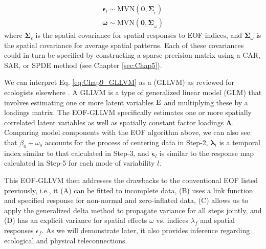 \begin{equation} \label{eq:Chap9_GLLVM}
\begin{gathered}
  \mathbf{\epsilon}_l \sim \mathrm{MVN}( \mathbf{0, \Sigma}_{\epsilon} ) \\
  \mathbf{\omega} \sim \mathrm{MVN}( \mathbf{0, \Sigma}_{\omega} )   
\end{gathered}
\end{equation}
where \( \mathbf{\Sigma}_{\epsilon} \) is the spatial covariance for spatial responses to EOF indices, and \( \mathbf{\Sigma}_{\omega} \) is the spatial covariance for average spatial patterns.  Each of these covariances could in turn be specified by constructing a sparse precision matrix using a CAR, SAR, or SPDE method (see Chapter \ref{sec:Chap5}).  

We can interpret Eq. \ref{eq:Chap9_GLLVM} as a  (GLLVM) \cite{moustaki_generalized_2000} as reviewed for ecologists elsewhere \cite{warton_so_2015}.  A GLLVM is a type of generalized linear model (GLM) that involves estimating one or more latent variables \(\mathbf{\operatorname{E}}\) and multiplying these by a loadings matrix.  The EOF-GLLVM specifically estimates one or more spatially correlated latent variables as well as spatially constant factor loadings \(\mathbf{\Lambda}\).  Comparing model components with the EOF algorithm above, we can also see that \(\beta_0 + \omega_s\) accounts for the process of centering data in Step-2, \( \mathbf{\lambda}_l \) is a temporal index similar to that calculated in Step-3, and \( \mathbf{\epsilon}_l \) is similar to the response map calculated in Step-5 for each mode of variability \(l\).  

This EOF-GLLVM then addresses the drawbacks to the conventional EOF listed previously, i.e., it (A) can be fitted to incomplete data, (B) uses a link function and specified response for non-normal and zero-inflated data, (C) allows us to apply the generalized delta method to propagate variance for all steps jointly, and (D) has an explicit variance for spatial effects \(\omega\) vs. indices \(\lambda_f\) and spatial responses \(\epsilon_f\).  As we will demonstrate later, it also provides inference regarding ecological and physical teleconnections.  

\lstset{style=Rcode}


